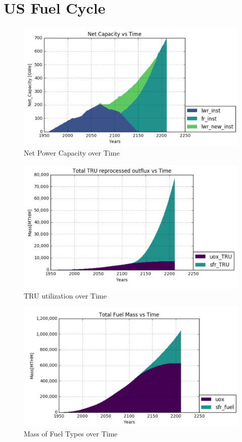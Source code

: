 \section{US Fuel Cycle}

\begin{figure}
	\centering
	\includegraphics[width=\linewidth]{images/transition-netcap}
	\caption{Net Power Capacity over Time}
	\label{fig:net-cap}
\end{figure}

\begin{figure}
	\centering
	\includegraphics[width=\linewidth]{images/transition-TRUutil}
	\caption{TRU utilization over Time}
	\label{fig:TRU-util}
\end{figure}

\begin{figure}
	\centering
	\includegraphics[width=\linewidth]{images/transition-fuelmass}
	\caption{Mass of Fuel Types over Time}
	\label{fig:fuel-mass}
\end{figure}